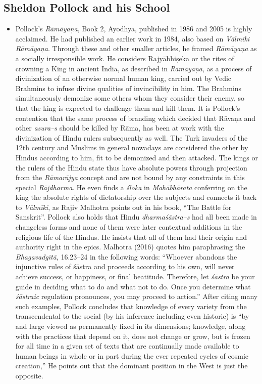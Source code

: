 \subsection*{Sheldon Pollock and his School}

\begin{itemize}
\item Pollock’s \textit{Rāmāyaņa}, Book 2, Ayodhya, published in 1986 and 2005 is highly acclaimed. He had published an earlier work in 1984, also based on \textit{Vālmīki Rāmāyaņa}. Through these and other smaller articles, he framed \textit{Rāmāyaņa} as a socially irresponsible work. He considers Rajyābhiṣeka or the rites of crowning a King in ancient India, as described in \textit{Rāmāyaņa}, as a process of divinization of an otherwise normal human king, carried out by Vedic Brahmins to infuse divine qualities of invincibility in him. The Brahmins simultaneously demonize some others whom they consider their enemy, so that the king is expected to challenge them and kill them. It is Pollock’s contention that the same process of branding which decided that Rāvaṇa and other \textit{asura–s} should be killed by Rāma, has been at work with the divinization of Hindu rulers subsequently as well. The Turk invaders of the 12th century and Muslims in general nowadays are considered the other by Hindus according to him, fit to be demonized and then attacked. The kings or the rulers of the Hindu state thus have absolute powers through projection from the \textit{Rāmarājya} concept and are not bound by any constraints in this special \textit{Rājdharma}. He even finds a \textit{śloka} in \textit{Mahābhārata} conferring on the king the absolute rights of dictatorship over the subjects and connects it back to \textit{Vālmīki}, as Rajiv Malhotra points out in his book, “The Battle for Sanskrit”. Pollock also holds that Hindu \textit{dharmaśāstra–s} had all been made in changeless forms and none of them were later contextual additions in the religious life of the Hindus. He insists that all of them had their origin and authority right in the epics. Malhotra (2016) quotes him paraphrasing the \textit{Bhagavadgītā}, 16.23–24 in the following words: “Whoever abandons the injunctive rules of śāstra and proceeds according to his own, will never achieve success, or happiness, or final beatitude. Therefore, let \textit{śāstra} be your guide in deciding what to do and what not to do. Once you determine what \textit{śāstraic} regulation pronounces, you may proceed to action.” After citing many such examples, Pollock concludes that knowledge of every variety from the transcendental to the social (by his inference including even historic) is “by and large viewed as permanently fixed in its dimensions; knowledge, along with the practices that depend on it, does not change or grow, but is frozen for all time in a given set of texts that are continually made available to human beings in whole or in part during the ever repeated cycles of cosmic creation,” He points out that the dominant position in the West is just the opposite.


\end{itemize}
